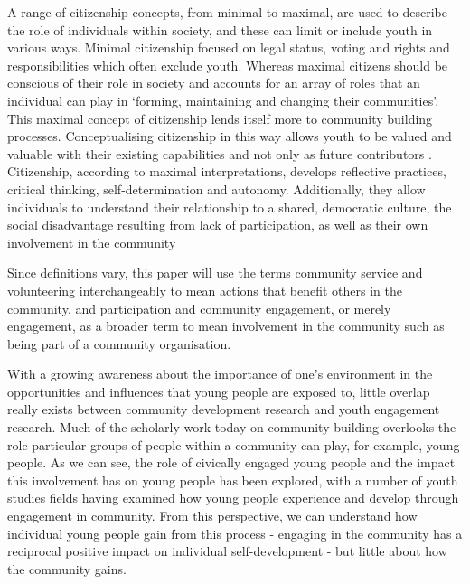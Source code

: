 A range of citizenship concepts, from minimal to maximal, are used to describe the role of individuals within society, and these can limit or include youth in various ways. Minimal citizenship focused on legal status, voting and rights and responsibilities which often exclude youth. Whereas maximal citizens should be conscious of their role in society and accounts for an array of roles that an individual can play in ‘forming, maintaining and changing their communities’. This maximal concept of citizenship lends itself more to community building processes. Conceptualising citizenship in this way allows youth to be valued and valuable with their existing capabilities and not only as future contributors \citep[][p108]{White2008}. Citizenship, according to maximal interpretations, develops reflective practices, critical thinking, self-determination and autonomy. Additionally, they allow individuals to understand their relationship to a shared, democratic culture, the social disadvantage resulting from lack of participation, as well as their own involvement in the community \citep[][p109]{White2008}

Since definitions vary, this paper will use the terms community service and volunteering interchangeably to mean actions that benefit others in the community, and participation and community engagement, or merely engagement, as a broader term to mean involvement in the community such as being part of a community organisation. %



With a growing awareness about the importance of one's environment in the opportunities and influences that young people are exposed to, little overlap really exists between community development research and youth engagement research. Much of the scholarly work today on community building overlooks the role particular groups of people within a community can play, for example, young people. As we can see, the role of civically engaged young people and the impact this involvement has on young people has been explored, with a number of youth studies fields having examined how young people experience and develop through engagement in community. From this perspective, we can understand how individual young people gain from this process - engaging in the community has a reciprocal positive impact on individual self-development \citep{Lerner2007} - but little about how the community gains. 




